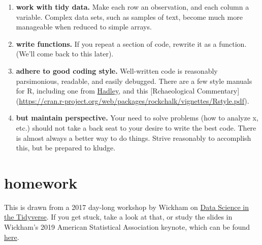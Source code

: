 \documentclass[
  openany]{book}
\newenvironment{Shaded}{\begin{snugshade}}{\end{snugshade}}
\newcommand{\CommentTok}[1]{\textcolor[rgb]{0.56,0.35,0.01}{\textit{#1}}}
\newcommand{\DecValTok}[1]{\textcolor[rgb]{0.00,0.00,0.81}{#1}}
\newcommand{\KeywordTok}[1]{\textcolor[rgb]{0.13,0.29,0.53}{\textbf{#1}}}
\newcommand{\NormalTok}[1]{#1}
\newcommand{\OperatorTok}[1]{\textcolor[rgb]{0.81,0.36,0.00}{\textbf{#1}}}
\newcommand{\StringTok}[1]{\textcolor[rgb]{0.31,0.60,0.02}{#1}}
\begin{document}
\begin{Shaded}
\end{Shaded}

\begin{enumerate}
\def\labelenumi{\arabic{enumi})}
\setcounter{enumi}{3}
\item
  \textbf{work with tidy data.} Make each row an observation, and each column a variable. Complex data sets, such as samples of text, become much more manageable when reduced to simple arrays.
\item
  \textbf{write functions.} If you repeat a section of code, rewrite it as a function. (We'll come back to this later).
\item
  \textbf{adhere to good coding style.} Well-written code is reasonably parsimonious, readable, and easily debugged. There are a few style manuals for R, including one from \href{http://adv-r.had.co.nz/Style.html}{Hadley}, and this {[}Rchaeological Commentary{]} (\url{https://cran.r-project.org/web/packages/rockchalk/vignettes/Rstyle.pdf}).
\item
  \textbf{but maintain perspective.} Your need to solve problems (how to analyze x, etc.) should not take a back seat to your desire to write the best code. There is almost always a better way to do things. Strive reasonably to accomplish this, but be prepared to kludge.
\end{enumerate}

\hypertarget{homework}{%
\section{homework}\label{homework}}

This is drawn from a 2017 day-long workshop by Wickham on \href{https://github.com/hadley/data-science-in-tidyverse}{Data Science in the Tidyverse}. If you get stuck, take a look at that, or study the slides in Wickham's 2019 American Statistical Association keynote, which can be found \href{https://speakerdeck.com/hadley/welcome-to-the-tidyverse}{here}.
\end{document}
